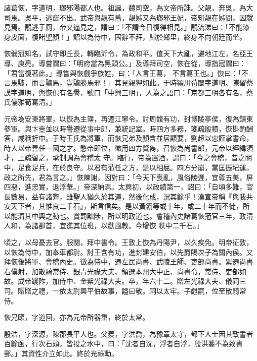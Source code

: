 \begin{pinyinscope}
 諸葛恢，字道明，瑯邪陽都人也。祖誕，魏司空，為文帝所誅。父靚，奔吳，為大司馬。吳平，逃竄不出。武帝與靚有舊，靚姊又為瑯邪王妃，帝知靚在姊間，因就見焉。靚逃于廁，帝又逼見之，謂曰：「不謂今日復得相見。」靚流涕曰：「不能漆身皮面，復睹聖顏！」詔以為侍中，固辭不拜，歸於鄉里，終身不向朝廷而坐。



 恢弱冠知名，試守即丘長，轉臨沂令，為政和平。值天下大亂，避地江左，名亞王導、庾亮。導嘗謂曰：「明府當為黑頭公。」及導拜司空，恢在從，導指冠謂曰：「君當復著此。」導嘗與恢戲爭族姓，曰：「人言王葛，
 不言葛王也。」恢曰：「不言馬驢，而言驢馬，豈驢勝馬邪！」其見親狎如此。于時潁川荀闓字道明、陳留蔡謨字道明，與恢俱有名譽，號曰「中興三明」，人為之語曰：「京都三明各有名，蔡氏儒雅荀葛清。」



 元帝為安東將軍，以恢為主簿，再遷江寧令。討周馥有功，封博陵亭侯，復為鎮東參軍。與卞壼並以時譽遷從事中郎，兼統記室。時四方多務，箋疏殷積，恢斟酌酬答，咸稱折中。于時王氏為將軍，而恢兄弟及顏含並居顯要，劉超以忠謹掌書命，時人以帝善任一國之才。愍帝即位，徵用四方賢雋，召恢為尚書郎，元帝以經緯須才，上疏留之，承制調為會稽太
 守。臨行，帝為置酒，謂曰：「今之會稽，昔之關中，足食足兵，在於良守。以君有蒞任之方，是以相屈。四方分崩，當匡振圮運。政之所先，君為言之。」恢陳謝，因對曰：「今天下喪亂，風俗陵遲，宜尊五美，屏四惡，進忠實，退浮華。」帝深納焉。太興初，以政績第一，詔曰：「自頃多難，官長數易，益有諸弊，雖聖人猶久於其道，然後化成，況其餘乎！漢宣帝稱『與我共安天下者，其惟良二千石』，斯言信矣。是以黃霸等或十年，或二十年而不徙，所以能濟其中興之勳也。賞罰黜陟，所以明政道也。會稽內史諸葛恢蒞官三年，政清人和，為諸郡首，宜進其位班，以勸風教。今增恢
 秩中二千石。」



 頃之，以母憂去官。服闋，拜中書令。王敦上恢為丹陽尹，以久疾免。明帝征敦，以恢為侍中，加奉車都尉。討王含有功，進封建安伯，以先爵賜次子為關內侯。又拜恢後將軍、會稽內史。徵為侍中，遷左民尚書、武陵王師、吏部尚書。累遷尚書右僕射，加散騎常侍、銀青光祿大夫、領選本州大中正、尚書令，常侍、吏部如故。成帝踐阼，加侍中、金紫光祿大夫。卒，年六十二。贈左光祿大夫、儀同三司。賵贈之禮，一依太尉興平伯故事，謚曰敬。祠以太牢。子甝嗣，位至散騎常侍。



 恢兄頤，字道回，亦為元帝所器重，終於太常。



 殷浩，字深源，陳郡長平人也。父羨，字洪喬，為豫章太守，都下人士因其致書者百餘函，行次石頭，皆投之水中，曰：「沈者自沈，浮者自浮，殷洪喬不為致書郵。」其資性介立如此。終於光祿勳。




\end{pinyinscope}
